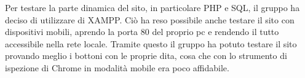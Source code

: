 Per testare la parte dinamica del sito, in particolare PHP e SQL, il gruppo ha deciso di utilizzare di XAMPP. Ciò ha reso possibile
anche testare il sito con dispositivi mobili, aprendo la porta 80 del proprio pc e rendendo il tutto accessibile nella rete locale.
Tramite questo il gruppo ha potuto testare il sito provando meglio i bottoni con le proprie dita, cosa che con lo strumento di ispezione
di Chrome in modalità mobile era poco affidabile.